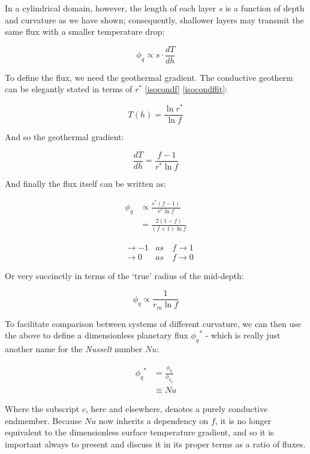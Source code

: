 \documentclass[a4paper,11pt,oneside]{book}
\begin{document}
In a cylindrical domain, however, the length of each layer $s$ is a function of depth and curvature as we have shown; consequently, shallower layers may transmit the same flux with a smaller temperature drop:

\begin{equation}
\phi_q \propto s \cdot \frac{dT}{dh}
\end{equation}

To define the flux, we need the geothermal gradient. The conductive geotherm can be elegantly stated in terms of $r^{*}$ \ref{isocondf} \ref{isocondffit}:

\begin{equation}
T(h) = \frac{\ln{r^{*}}}{\ln{f}}
\end{equation}

And so the geothermal gradient:

\begin{equation}
\frac{dT}{dh} = \frac{f-1}{r^{*}\ln{f}}
\end{equation}

And finally the flux itself can be written as:

\begin{align*}
\phi_q &\propto \frac{s^{*}(f-1)}{r^{*}\ln{f}} \\
&= \frac{2(1-f)}{(f+1)\ln{f}}
\end{align*}

\begin{align*}
&\to -1 &as \quad f \to 1 \\
&\to 0 &as \quad f \to 0
\end{align*}

Or very succinctly in terms of the `true' radius of the mid-depth:

\begin{equation}
\phi_q \propto \frac{1}{r_m \ln{f}}
\end{equation}

To facilitate comparison between systems of different curvature, we can then use the above to define a dimensionless planetary flux ${\phi_q}^{*}$ - which is really just another name for the \textit{Nusselt} number $Nu$:

\begin{align*}
{\phi_q}^{*} &= \frac{ {\phi_q} }{ {\phi_q}_c } \\
&\equiv Nu
\end{align*}

Where the subscript $c$, here and elsewhere, denotes a purely conductive endmember. Because $Nu$ now inherits a dependency on $f$, it is no longer equivalent to the dimensionless surface temperature gradient, and so it is important always to present and discuss it in its proper terms as a ratio of fluxes.
\end{document}
